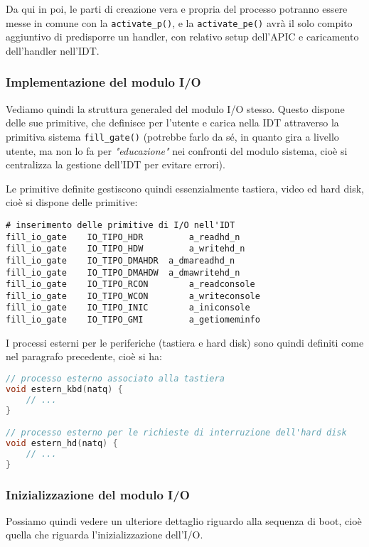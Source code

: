 \documentclass[a4paper,11pt]{article}
\begin{document}
Da qui in poi, le parti di creazione vera e propria del processo potranno essere messe in comune con la \lstinline|activate_p()|, e la \lstinline|activate_pe()| avrà il solo compito aggiuntivo di predisporre un handler, con relativo setup dell'APIC e caricamento dell'handler nell'IDT.

\subsubsection{Implementazione del modulo I/O}
Vediamo quindi la struttura generaled del modulo I/O stesso.
Questo dispone delle sue primitive, che definisce per l'utente e carica nella IDT attraverso la primitiva sistema \lstinline|fill_gate()| (potrebbe farlo da sé, in quanto gira a livello utente, ma non lo fa per \textit{"educazione"} nei confronti del modulo sistema, cioè si centralizza la gestione dell'IDT per evitare errori).

Le primitive definite gestiscono quindi essenzialmente tastiera, video ed hard disk, cioè si dispone delle primitive:
\begin{lstlisting}[language=assembler, style=codestyle]	
# inserimento delle primitive di I/O nell'IDT
fill_io_gate	IO_TIPO_HDR			a_readhd_n
fill_io_gate	IO_TIPO_HDW			a_writehd_n
fill_io_gate	IO_TIPO_DMAHDR	a_dmareadhd_n
fill_io_gate	IO_TIPO_DMAHDW	a_dmawritehd_n
fill_io_gate	IO_TIPO_RCON		a_readconsole
fill_io_gate	IO_TIPO_WCON		a_writeconsole
fill_io_gate	IO_TIPO_INIC		a_iniconsole
fill_io_gate	IO_TIPO_GMI			a_getiomeminfo
\end{lstlisting}

I processi esterni per le periferiche (tastiera e hard disk) sono quindi definiti come nel paragrafo precedente, cioè si ha:
\begin{lstlisting}[language=C++, style=codestyle]	
// processo esterno associato alla tastiera
void estern_kbd(natq) {
	// ...
}

// processo esterno per le richieste di interruzione dell'hard disk
void estern_hd(natq) {
	// ...
}
\end{lstlisting}

\subsubsection{Inizializzazione del modulo I/O}
Possiamo quindi vedere un ulteriore dettaglio riguardo alla sequenza di boot, cioè quella che riguarda l'inizializzazione dell'I/O.
\end{document}
